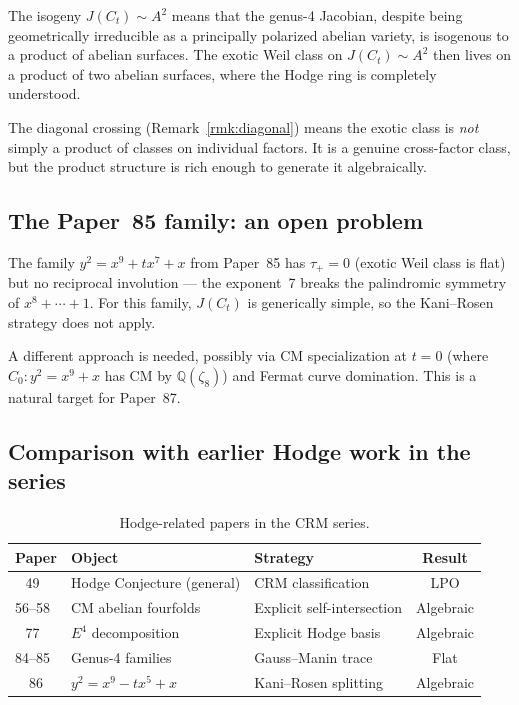 \documentclass[11pt]{article}
\theoremstyle{plain}
\theoremstyle{definition}
\theoremstyle{remark}
\newcommand{\Q}{\mathbb{Q}}
\begin{document}
The isogeny $J(C_t) \sim A^2$ means that the genus-4 Jacobian,
despite being geometrically irreducible as a principally polarized
abelian variety, is isogenous to a product of abelian surfaces.
The exotic Weil class on $J(C_t) \sim A^2$ then lives on a
product of two abelian surfaces, where the Hodge ring is completely
understood.

The diagonal crossing (Remark~\ref{rmk:diagonal}) means the exotic
class is \emph{not} simply a product of classes on individual factors.
It is a genuine cross-factor class, but the product structure is
rich enough to generate it algebraically.

\subsection{The Paper~85 family: an open problem}

The family $y^2 = x^9 + tx^7 + x$ from Paper~85 has $\tau_+ = 0$
(exotic Weil class is flat) but no reciprocal involution ---
the exponent~7 breaks the palindromic symmetry of $x^8 + \cdots + 1$.
For this family, $J(C_t)$ is generically simple, so the Kani--Rosen
strategy does not apply.

A different approach is needed, possibly via CM specialization at
$t = 0$ (where $C_0\colon y^2 = x^9 + x$ has CM by $\Q(\zeta_8)$)
and Fermat curve domination.  This is a natural target for Paper~87.

\subsection{Comparison with earlier Hodge work in the series}

\begin{table}[h]
\centering
\small
\begin{tabular}{c l l c}
\toprule
\textbf{Paper} & \textbf{Object} & \textbf{Strategy} & \textbf{Result} \\
\midrule
49~\cite{P49} & Hodge Conjecture (general) & CRM classification & LPO \\
56--58~\cite{P56} & CM abelian fourfolds & Explicit self-intersection & Algebraic \\
77~\cite{P77} & $E^4$ decomposition & Explicit Hodge basis & Algebraic \\
84--85~\cite{P84,P85} & Genus-4 families & Gauss--Manin trace & Flat \\
86 & $y^2 = x^9 - tx^5 + x$ & Kani--Rosen splitting & Algebraic \\
\bottomrule
\end{tabular}
\caption{Hodge-related papers in the CRM series.}
\label{tab:hodge}
\end{table}
\end{document}
